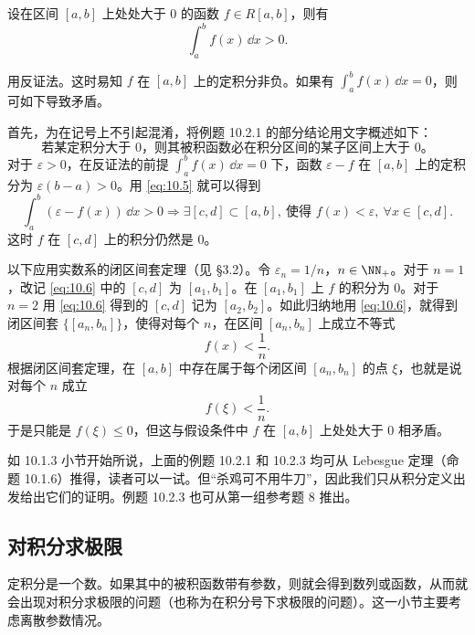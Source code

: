 \begin{xexample}[10.2.3]
设在区间 $[a,b]$ 上处处大于 0 的函数 $f\in R[a,b]$，则有
\[
  \int_a^b f(x)\,\dd x>0.
\]
\end{xexample}
\begin{xsolution}
用反证法。这时易知 $f$ 在 $[a,b]$ 上的定积分非负。如果有 $\int_a^b f(x)\,\dd x=0$，则可如下导致矛盾。

首先，为在记号上不引起混淆，将例题 10.2.1 的部分结论用文字概述如下：
\begin{equation}
  \text{若某定积分大于 0，则其被积函数必在积分区间的某子区间上大于 0。}
  \tag{10.5}
  \label{eq:10.5}
\end{equation}
对于 $\varepsilon>0$，在反证法的前提 $\int_a^b f(x)\,\dd x=0$ 下，函数 $\varepsilon-f$ 在 $[a,b]$ 上的定积分为 $\varepsilon(b-a)>0$。用 \eqref{eq:10.5} 就可以得到
\begin{equation}
  \int_a^b(\varepsilon-f(x))\,\dd x>0
  \Longrightarrow
  \exists[c,d]\subset[a,b],\ \text{使得 }f(x)<\varepsilon,\ \forall x\in[c,d].
  \tag{10.6}
  \label{eq:10.6}
\end{equation}
这时 $f$ 在 $[c,d]$ 上的积分仍然是 0。

以下应用实数系的闭区间套定理（见 §3.2）。令 $\varepsilon_n=1/n$，$n\in\NN_+$。对于 $n=1$，改记 \eqref{eq:10.6} 中的 $[c,d]$ 为 $[a_1,b_1]$。在 $[a_1,b_1]$ 上 $f$ 的积分为 0。对于 $n=2$ 用 \eqref{eq:10.6} 得到的 $[c,d]$ 记为 $[a_2,b_2]$。如此归纳地用 \eqref{eq:10.6}，就得到闭区间套 $\{[a_n,b_n]\}$，使得对每个 $n$，在区间 $[a_n,b_n]$ 上成立不等式
\[
  f(x)<\frac1n.
\]
根据闭区间套定理，在 $[a,b]$ 中存在属于每个闭区间 $[a_n,b_n]$ 的点 $\xi$，也就是说对每个 $n$ 成立
\[
  f(\xi)<\frac1n.
\]
于是只能是 $f(\xi)\leqslant0$，但这与假设条件中 $f$ 在 $[a,b]$ 上处处大于 0 相矛盾。
\end{xsolution}

\begin{xremark}
如 10.1.3 小节开始所说，上面的例题 10.2.1 和 10.2.3 均可从 Lebesgue 定理（命题 10.1.6）推得，读者可以一试。但“杀鸡可不用牛刀”，因此我们只从积分定义出发给出它们的证明。例题 10.2.3 也可从第一组参考题 8 推出。
\end{xremark}

\subsection{对积分求极限}

定积分是一个数。如果其中的被积函数带有参数，则就会得到数列或函数，从而就会出现对积分求极限的问题（也称为在积分号下求极限的问题）。这一小节主要考虑离散参数情况。

